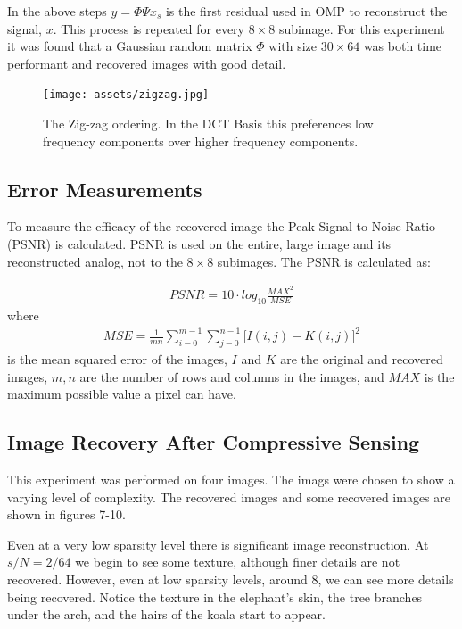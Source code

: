 \documentclass{article}
\begin{document}
In the above steps $y = \Phi \Psi x_s$ is the first residual used in OMP to reconstruct the signal, $x$.
This process is repeated for every $8 \times 8$ subimage.
For this experiment it was found that a Gaussian random matrix $\Phi$ with size $30 \times 64$ was both time performant and recovered images with good detail.

\begin{figure}[H]
    \captionsetup{width=.5\linewidth}
    \centering
        \texttt{[image: assets/zigzag.jpg]}
        \caption{The Zig-zag ordering. In the DCT Basis this preferences low frequency components over higher frequency components.}
\end{figure}


\subsection*{Error Measurements}

To measure the efficacy of the recovered image the Peak Signal to Noise Ratio (PSNR) is calculated.
PSNR is used on the entire, large image and its reconstructed analog, not to the $8 \times 8$ subimages.
The PSNR is calculated as:

\begin{align} 
    PSNR = 10 \cdot log_{10} \frac{MAX^2}{MSE}
\end{align}
where
\begin{align} 
    MSE = \frac{1}{mn} \sum_{i-0}^{m-1} \sum_{j-0}^{n-1} \Big[ I(i,j) - K(i,j) \Big]^2
\end{align}
is the mean squared error of the images, $I$ and $K$ are the original and recovered images, $m, n$ are the number of rows and columns in the images, and $MAX$ is the maximum possible value a pixel can have.


\newpage
\subsection*{Image Recovery After Compressive Sensing}

This experiment was performed on four images.
The imags were chosen to show a varying level of complexity.
The recovered images and some recovered images are shown in figures 7-10.

Even at a very low sparsity level there is significant image reconstruction.
At $s/N = 2/64$ we begin to see some texture, although finer details are not recovered.
However, even at low sparsity levels, around 8, we can see more details being recovered.
Notice the texture in the elephant's skin, the tree branches under the arch, and the hairs of the koala start to appear.
\end{document}

